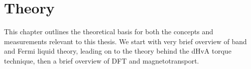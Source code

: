\chapter{Theory}

\begin{chapterabstract}
This chapter outlines the theoretical basis for both the concepts and measurements relevant to this thesis. We start with very brief overview of band and Fermi liquid theory, leading on to the theory behind the \ac{dHvA} torque technique, then a brief overview of \ac{DFT} and magnetotransport.
\end{chapterabstract}











